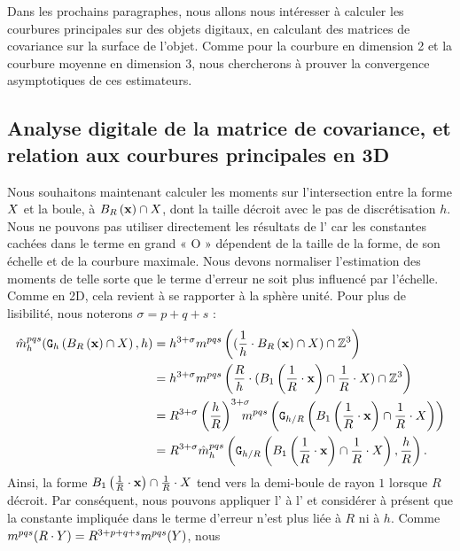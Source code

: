 Dans les prochains paragraphes, nous allons nous intéresser à calculer les
courbures principales sur des objets digitaux, en calculant des matrices de
covariance sur la surface de l'objet. Comme pour la courbure en dimension 2 et
la courbure moyenne en dimension 3, nous chercherons à prouver la convergence
asymptotiques de ces estimateurs.

\subsection{Analyse digitale de la matrice de covariance, et
relation aux courbures principales en 3D}
\label{sec:ii-3d}
%
Nous souhaitons maintenant calculer les moments sur l'intersection entre la forme
$X$ et la boule, \cad à $B_{R}\left(\mathbf{x}\right) \cap X$, dont la taille décroit
avec le pas de discrétisation $h$. Nous ne pouvons pas utiliser directement les résultats
de l' car les constantes cachées dans le
terme en grand « O » dépendent de la taille de la forme, de son échelle et de la
courbure maximale. Nous devons normaliser l'estimation des moments de telle sorte
que le terme d'erreur ne soit plus influencé par l'échelle. Comme en 2D, cela
revient à se rapporter à la sphère unité. Pour plus de lisibilité, nous noterons
$\sigma = p + q + s$ :
%
\begin{align} \label{eq:MomentsOnUnitaryBall}
%
  \DMom{pqs}{h}(\DigF{\Ball{R}{\vx} \cap \Shape}{h},h) &= h^{3+\sigma}\Mom{pqs}\left
  ( (\frac{1}{h} \cdot \Ball{R}{\vx} \cap \Shape) \cap \Z^3 \right) \nonumber \\
  &= h^{3+{\sigma}} \Mom{pqs}\left( \frac{R}{h}\cdot(
  \Ball{1}{\frac{1}{R} \cdot \vx} \cap \frac{1}{R} \cdot \Shape) \cap \Z^3 \right) \nonumber \\
  &= R^{3+{\sigma}} \left( \frac{h}{R} \right)^{3+{\sigma}} \hspace{-0.3cm} \Mom{pqs} \left( \DigF{ \Ball{1}{\frac{1}{R}\cdot \vx}\cap\frac{1}{R}\cdot \Shape}{h/R} \right) \nonumber\\
  &= R^{3+{\sigma}}\DMom{pqs}{h}\left( \DigF{ \Ball{1}{\frac{1}{R}\cdot \vx}\cap\frac{1}{R}\cdot \Shape}{h/R}, {\frac{h}{R}} \right).
%
\end{align}
%
Ainsi, la forme $B_{1}\left(\frac{1}{R} \cdot \mathbf{x}\right)\cap\frac{1}{R}\cdot X$
tend vers la demi-boule de rayon $1$ lorsque $R$ décroit. Par conséquent, nous
pouvons appliquer l' à
l' et considérer à présent que la constante
impliquée dans le terme d'erreur n'est plus liée à $R$ ni à $h$. Comme $m^{pqs}(R \cdot Y) = R^{3+p+q+s} m^{pqs}(Y)$, nous
